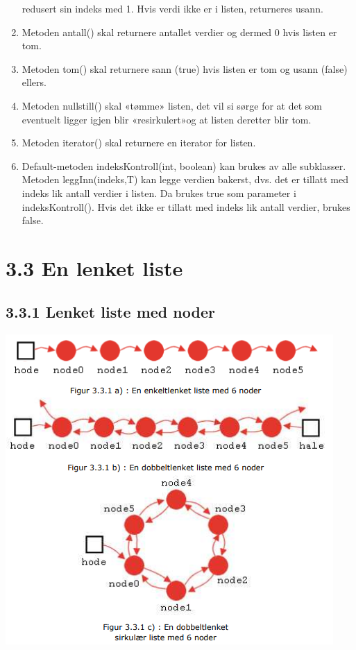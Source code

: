 \documentclass[11pt]{article}
\begin{document}
\begin{enumerate}
                redusert sin indeks med 1. Hvis verdi ikke er i listen, returneres usann.
                \item Metoden antall() skal returnere antallet verdier og dermed 0 hvis listen er tom.
                \item Metoden tom() skal returnere sann (true) hvis listen er tom og usann (false) ellers.
                \item Metoden nullstill() skal «tømme» listen, det vil si sørge for at det som eventuelt
                ligger igjen blir «resirkulert»og at listen deretter blir tom.
                \item Metoden iterator() skal returnere en iterator for listen.
                \item Default-metoden indeksKontroll(int, boolean) kan brukes av alle subklasser.
                Metoden leggInn(indeks,T) kan legge verdien bakerst, dvs. det er tillatt med indeks
                lik antall verdier i listen. Da brukes true som parameter i indeksKontroll(). Hvis det
                ikke er tillatt med indeks lik antall verdier, brukes false. 
            \end{enumerate}

\section{3.3 En lenket liste}

    \subsection{3.3.1 Lenket liste med noder}
        \includegraphics[center]{f-3.3.1abc.png}
\end{document}
